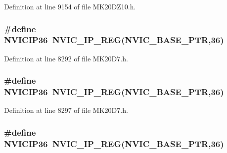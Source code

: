 Definition at line 9154 of file M\+K20\+D\+Z10.\+h.

\subsubsection[{\texorpdfstring{N\+V\+I\+C\+I\+P36}{NVICIP36}}]{\setlength{\rightskip}{0pt plus 5cm}\#define N\+V\+I\+C\+I\+P36~{\bf N\+V\+I\+C\+\_\+\+I\+P\+\_\+\+R\+EG}({\bf N\+V\+I\+C\+\_\+\+B\+A\+S\+E\+\_\+\+P\+TR},36)}\hypertarget{group___n_v_i_c___register___accessor___macros_ga8656b82e2a8cbe88ae98f3f892d3e7dd}{}\label{group___n_v_i_c___register___accessor___macros_ga8656b82e2a8cbe88ae98f3f892d3e7dd}


Definition at line 8292 of file M\+K20\+D7.\+h.

\subsubsection[{\texorpdfstring{N\+V\+I\+C\+I\+P36}{NVICIP36}}]{\setlength{\rightskip}{0pt plus 5cm}\#define N\+V\+I\+C\+I\+P36~{\bf N\+V\+I\+C\+\_\+\+I\+P\+\_\+\+R\+EG}({\bf N\+V\+I\+C\+\_\+\+B\+A\+S\+E\+\_\+\+P\+TR},36)}\hypertarget{group___n_v_i_c___register___accessor___macros_ga8656b82e2a8cbe88ae98f3f892d3e7dd}{}\label{group___n_v_i_c___register___accessor___macros_ga8656b82e2a8cbe88ae98f3f892d3e7dd}


Definition at line 8297 of file M\+K20\+D7.\+h.

\subsubsection[{\texorpdfstring{N\+V\+I\+C\+I\+P36}{NVICIP36}}]{\setlength{\rightskip}{0pt plus 5cm}\#define N\+V\+I\+C\+I\+P36~{\bf N\+V\+I\+C\+\_\+\+I\+P\+\_\+\+R\+EG}({\bf N\+V\+I\+C\+\_\+\+B\+A\+S\+E\+\_\+\+P\+TR},36)}\hypertarget{group___n_v_i_c___register___accessor___macros_ga8656b82e2a8cbe88ae98f3f892d3e7dd}{}\label{group___n_v_i_c___register___accessor___macros_ga8656b82e2a8cbe88ae98f3f892d3e7dd}



